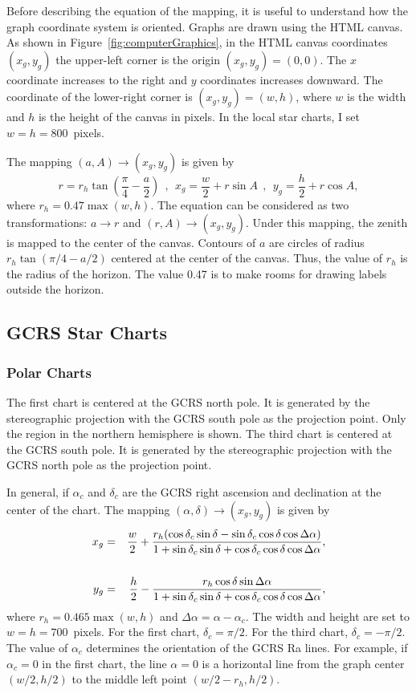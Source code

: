 \documentclass[12pt]{article}
\newcommand \beq {\begin{equation}}
\newcommand \eeq {\end{equation}}
\newcommand \beqn {\begin{eqnarray}}
\newcommand \eeqn {\end{eqnarray}}
\begin{document}
Before describing the equation of the mapping, it is useful to understand how the 
graph coordinate system is oriented. Graphs are drawn using the HTML canvas. 
As shown in Figure~\ref{fig:computerGraphics}, in the HTML canvas coordinates $(x_g,y_g)$
the upper-left corner is the origin $(x_g,y_g)=(0,0)$. The $x$ coordinate increases to the 
right and $y$ coordinates increases downward. The coordinate of the lower-right 
corner is $(x_g,y_g)=(w,h)$, where $w$ is the width and $h$ is the height of the canvas 
in pixels. In the local star charts, I set $w=h=800$~pixels.

The mapping $(a,A) \rightarrow (x_g,y_g)$ is given by 
\beq 
  r = r_h \tan\left( \frac{\pi}{4} -\frac{a}{2}\right) \ \ , \ \ 
  x_g = \frac{w}{2} + r \sin A \ \ , \ \ y_g = \frac{h}{2} + r \cos A , 
\label{eq:stereographicHor}
\eeq
where $r_h = 0.47\max(w,h)$. The equation can be considered as two transformations: 
$a \rightarrow r$ and $(r,A) \rightarrow (x_g, y_g)$. Under this mapping, the zenith 
is mapped to the center of the canvas. Contours of $a$ are circles 
of radius $r_h\tan(\pi/4 - a/2)$ centered at the center of the canvas. Thus, the value of 
$r_h$ is the radius of the horizon. The value 0.47 is to make rooms for drawing labels 
outside the horizon.

\subsection{GCRS Star Charts}

\subsubsection{Polar Charts} 

The first chart is centered at the GCRS north pole. It is generated by 
the stereographic projection with the GCRS south pole as the projection 
point. Only the region in the northern hemisphere is shown. The third chart 
is centered at the GCRS south pole. It is generated by the stereographic projection 
with the GCRS north pole as the projection point. 

In general, if $\alpha_c$ and $\delta_c$ are the GCRS right ascension and declination 
at the center of the chart. The mapping $(\alpha,\delta) \rightarrow (x_g,y_g)$ is 
given by 
\beqn
  x_g &=& \frac{w}{2} + \frac{r_h (\cos \delta_c \sin \delta 
- \sin \delta_c \cos \delta \cos \Delta \alpha )}{1 + \sin \delta_c \sin \delta 
+ \cos \delta_c \cos \delta \cos \Delta \alpha} ,
\label{eq:stereographicXg} \\ \cr
  y_g &=& \frac{h}{2} - \frac{r_h \cos \delta \sin \Delta \alpha}{1 + 
\sin \delta_c \sin \delta + \cos \delta_c \cos \delta \cos \Delta \alpha} , 
\label{eq:stereographicYg}
\eeqn
where $r_h = 0.465\max(w,h)$ and $\Delta \alpha = \alpha - \alpha_c$. 
The width and height are set to $w=h=700$~pixels.
For the first chart, $\delta_c=\pi/2$. For the third chart, $\delta_c=-\pi/2$. 
The value of $\alpha_c$ determines the orientation of the GCRS Ra lines. 
For example, if $\alpha_c=0$ in the first chart, the line $\alpha=0$ 
is a horizontal line from the graph center $(w/2,h/2)$ to the 
middle left point $(w/2 - r_h, h/2)$. 
\end{document}
